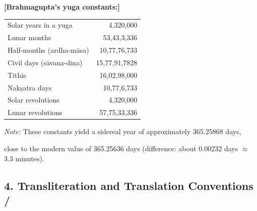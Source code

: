 \documentclass[10pt,a4paper]{article}
\begin{document}
\begin{minipage}[t]{0.47\textwidth}

\textbf{[Brahmagupta's yuga constants:]}

\begin{tabular}{@{}lr@{}}

Solar years in a yuga & 4,320,000 \\

Lunar months & 53,43,3,336 \\

Half-months (ardha-māsa) & 10,77,76,733 \\

Civil days (sāvana-dina) & 15,77,91,7828 \\

Tithis & 16,02,98,000 \\

Nakṣatra days & 10,77,6,733 \\

Solar revolutions & 4,320,000 \\

Lunar revolutions & 57,75,33,336 \\

\end{tabular}



\vspace{1em}

\textit{Note:} These constants yield a sidereal year of approximately 365.25868 days,

close to the modern value of 365.25636 days (difference: about 0.00232 days $\approx$ 3.3 minutes).

\end{minipage}



\vspace{1.5em}



\subsection*{4. Transliteration and Translation Conventions / }
\end{document}
